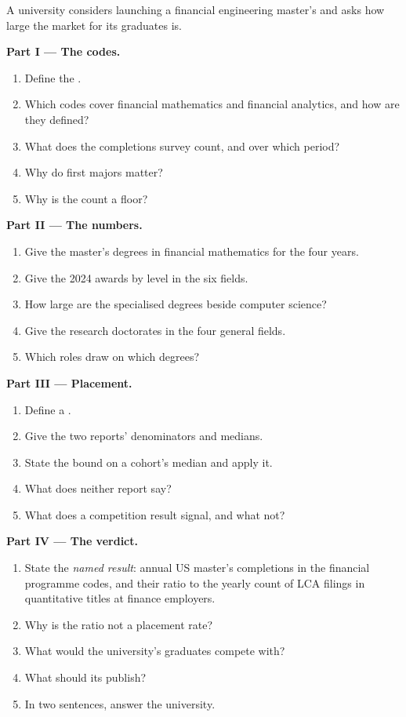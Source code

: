 \begin{problem}\label{pb:in:education-pipelines:1}
A university considers launching a financial engineering master's and asks how large the market for its graduates is.

\medskip\noindent\textbf{Part I --- The codes.}
\begin{enumerate}
\item Define the .
\item Which codes cover financial mathematics and financial analytics, and how are they defined?
\item What does the completions survey count, and over which period?
\item Why do first majors matter?
\item Why is the count a floor?
\end{enumerate}

\medskip\noindent\textbf{Part II --- The numbers.}
\begin{enumerate}[resume]
\item Give the master's degrees in financial mathematics for the four years.
\item Give the 2024 awards by level in the six fields.
\item How large are the specialised degrees beside computer science?
\item Give the research doctorates in the four general fields.
\item Which roles draw on which degrees?
\end{enumerate}

\medskip\noindent\textbf{Part III --- Placement.}
\begin{enumerate}[resume]
\item Define a .
\item Give the two reports' denominators and medians.
\item State the bound on a cohort's median and apply it.
\item What does neither report say?
\item What does a competition result signal, and what not?
\end{enumerate}

\medskip\noindent\textbf{Part IV --- The verdict.}
\begin{enumerate}[resume]
\item State the \emph{named result}: annual US master's completions in the financial programme codes, and their ratio to
the yearly count of LCA filings in quantitative titles at finance employers.
\item Why is the ratio not a placement rate?
\item What would the university's graduates compete with?
\item What should its  publish?
\item In two sentences, answer the university.
\end{enumerate}
\end{problem}

